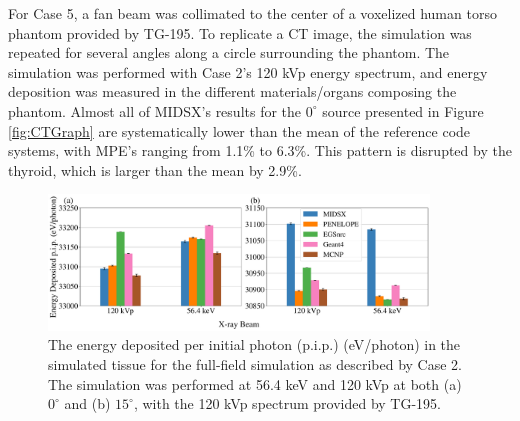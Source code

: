 \par For Case 5, a fan beam was collimated to the center of a voxelized human torso phantom provided by TG-195. To replicate a CT image, the simulation was repeated for several angles along a circle surrounding the phantom. The simulation was performed with Case 2's 120 kVp energy spectrum, and energy deposition was measured in the different materials/organs composing the phantom. Almost all of MIDSX's results for the $0^\circ$ source presented in Figure \ref{fig:CTGraph} are systematically lower than the mean of the reference code systems, with MPE's ranging from 1.1\% to 6.3\%. This pattern is disrupted by the thyroid, which is larger than the mean by 2.9\%. 




\begin{figure}[p]
    \centering
	\includegraphics[width=0.90\textwidth]{../figures/radiography_body_dep_paper_ready.pdf}
	\caption{The energy deposited per initial photon (p.i.p.) (eV/photon) in the simulated tissue for the full-field simulation as described by Case 2. The simulation was performed at 56.4 keV and 120 kVp at both (a) $0^\circ$ and (b) $15^\circ$, with the 120 kVp spectrum provided by TG-195.}
 	\label{fig:BDGraph}
\end{figure}




